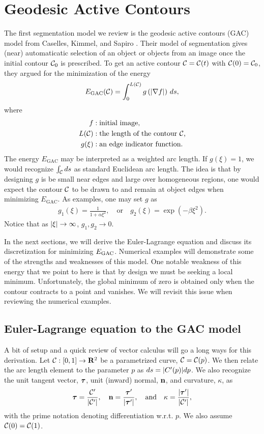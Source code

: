 \chapter{Geodesic Active Contours}
\label{ch:gac}
The first segmentation model we review is the geodesic active contours (GAC) model from Caselles, Kimmel, and Sapiro \cite{caselles1997geodesic}. Their model of segmentation gives (near) automaticatic selection of an object or objects from an image once the initial contour $\mathcal{C}_0$ is prescribed. To get an active contour $\mathcal{C} = \mathcal{C}(t)$ with $\mathcal{C}(0) = \mathcal{C}_0$, they argued for the minimization of the energy 
\begin{align}
E_\mathrm{GAC}(\mathcal{C}) = \int^{L(\mathcal{C})}_0 g\left( \lvert\nabla f \rvert \right) \, ds,
\label{eq:egac}
\end{align}
where 
\begin{align*}
f&: \textrm{initial image},
\\
L(\mathcal{C}) &: \textrm{the length of the contour $\mathcal{C}$,} 
\\ 
g(\xi)&: \textrm{an edge indicator function}.
\end{align*}
The energy $E_\textrm{GAC}$ may be interpreted as a weighted arc length. If $g(\xi) = 1$, we would recognize $\int_{\mathcal{C}}  ds$ as standard Euclidean arc length. The idea is that by designing $g$ is be small near edges and large over homogeneous regions, one would expect the contour $\mathcal{C}$ to be drawn to and remain at object edges when minimizing $E_\textrm{GAC}$. As examples, one may set $g$ as 
\begin{align*}
g_1(\xi) 
= \frac{1}{1 + \alpha\xi^2},
\quad\text{or}\quad 
g_2(\xi) 
= \exp(-\beta\xi^2).
\end{align*}
Notice that as $\lvert\xi\rvert \rightarrow \infty$, $g_1,g_2 \rightarrow 0$.  

In the next sections, we will derive the Euler-Lagrange equation and discuss its discretization for minimizing $E_\textrm{GAC}$. Numerical examples will demonstrate some of the strengths and weaknesses of this model. One notable weakness of this energy that we point to here is that by design we must be seeking a local minimum. Unfortunately, the global minimum of zero is obtained only when the contour contracts to a point and vanishes. We will revisit this issue when reviewing the numerical examples.


\section{Euler-Lagrange equation to the GAC model} 
A bit of setup and a quick review of vector calculus will go a long ways for this derivation. Let $\mathcal{C}: [0,1]\rightarrow \mathbf{R}^2$ be a parametrized curve, $\mathcal{C} = \mathcal{C}(p)$. We then relate the arc length element to the parameter $p$ as $ds = \lvert C'(p)\rvert dp$. We also recognize the unit tangent vector, $\boldsymbol{\tau}$, unit (inward) normal, $\mathbf{n}$, and curvature, $\kappa$, as 
\begin{align*}
\boldsymbol{\tau} 
= \frac{\mathcal{C}'}{\lvert\mathcal{C}'\rvert},\quad 
\mathbf{n} 
= \frac{ \boldsymbol{\tau} '}{\lvert\boldsymbol{\tau}'\rvert},
\quad\text{and}\quad 
\kappa = \frac{ \lvert\boldsymbol{\tau}'\rvert }{ \lvert \mathcal{C}' \rvert },
\end{align*}
with the prime notation denoting differentiation w.r.t. $p$. We also assume $\mathcal{C}(0) = \mathcal{C}(1)$. 

